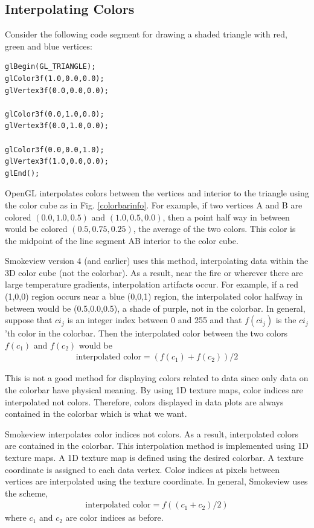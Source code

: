 \documentclass[11pt,twoside]{book}
\begin{document}
\subsection{Interpolating Colors}

Consider the following code segment for drawing a shaded triangle
with red, green and blue vertices:
\begin{lstlisting}
glBegin(GL_TRIANGLE);
glColor3f(1.0,0.0,0.0);
glVertex3f(0.0,0.0,0.0);

glColor3f(0.0,1.0,0.0);
glVertex3f(0.0,1.0,0.0);

glColor3f(0.0,0.0,1.0);
glVertex3f(1.0,0.0,0.0);
glEnd();
\end{lstlisting}

OpenGL interpolates colors between the vertices and interior to
the triangle using the color cube as in Fig. \ref{colorbarinfo}.
For example, if two vertices A and B are colored $(0.0,1.0,0.5)$
and $(1.0,0.5,0.0)$, then a point half way in between would be
colored $(0.5,0.75,0.25)$, the average of the two colors.  This
color is the midpoint of the line segment AB interior to the color
cube.

Smokeview version 4 (and earlier) uses this method, interpolating
data within the 3D color cube (not the colorbar).  As a result,
near the fire or wherever there are large temperature gradients,
interpolation artifacts occur.  For example, if a red (1,0,0)
region occurs near a blue (0,0,1) region, the interpolated color
halfway in between would be (0.5,0.0,0.5), a shade of purple, not
in the colorbar.  In general, suppose that $ci_j$ is an integer
index between 0 and 255 and that $f(ci_j)$ is the $ci_j$'th color
in the colorbar.  Then the interpolated color between the
two colors $f(c_1)$ and $f(c_2)$ would be
\begin{eqnarray}
\mbox{interpolated color}=(f(c_1)+f(c_2))/2
\end{eqnarray}

This is not a good method for displaying colors related to data
since only data on the colorbar have physical meaning.  By using
1D texture maps, color indices are interpolated not colors.
Therefore, colors displayed in data plots are always contained in
the colorbar which is what we want.

Smokeview interpolates color indices not colors. As a result,
interpolated colors are contained in the colorbar.  This
interpolation method is implemented using 1D texture maps.  A 1D
texture map is defined using the desired colorbar.  A texture
coordinate is assigned to each data vertex.    Color indices at
pixels between vertices are interpolated using the texture
coordinate.  In general, Smokeview uses the scheme,
\begin{eqnarray}
\mbox{interpolated color}=f((c_1+c_2)/2)
\end{eqnarray}
where $c_1$ and $c_2$ are color indices as before.
\end{document}

